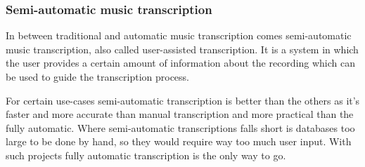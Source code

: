 \subsubsection{Semi-automatic music transcription}
In between traditional and automatic music transcription comes semi-automatic music transcription, also called user-assisted transcription. It is a system in which the user provides a certain amount of information about the recording which can be used to guide the transcription process. \cite{semi-automatic}
\par

For certain use-cases semi-automatic transcription is better than the others as it's faster and more accurate than manual transcription and more practical than the fully automatic. Where semi-automatic transcriptions falls short is databases too large to be done by hand, so they would require way too much user input. With such projects fully automatic transcription is the only way to go.